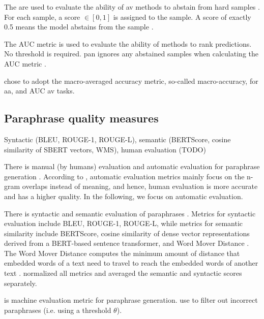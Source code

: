 The  are used to evaluate the ability of \ac{av} methods 
to abstain from hard samples \cite{tyo_state_2022}.
For each sample, a score $\in [0, 1]$ is assigned to the sample.
A score of exactly 0.5 means the model abstains from the sample \cite{tyo_state_2022,bevendorff_overview_2024,kocher_unine_2015}.

The AUC metric is used to evaluate the ability of methods to rank predictions.
No threshold is required.
\ac{pan} ignores any abstained samples when calculating the AUC metric \cite{tyo_state_2022}.

\citet{tyo_state_2022} chose to adopt the macro-averaged accuracy metric, so-called macro-accuracy, for \ac{aa}, 
and AUC \ac{av} tasks.

\subsection{Paraphrase quality measures}
\label{subsec:paraphrase_quality_measures}

Syntactic (BLEU, ROUGE-1, ROUGE-L), semantic (BERTScore, cosine similarity of SBERT vectors, WMS), human evaluation (TODO)

There is manual (by humans) evaluation and automatic evaluation for paraphrase generation \cite{fu_learning_2024,zhou_paraphrase_2021}.
According to \citet{zhou_paraphrase_2021}, automatic evaluation metrics mainly focus on the n-gram overlaps instead of meaning, 
and hence, human evaluation is more accurate and has a higher quality.
In the following, we focus on automatic evaluation.

There is syntactic and semantic evaluation of paraphrases \cite{gohsen_captions_2023}.
Metrics for syntactic evaluation include BLEU, ROUGE-1, ROUGE-L, 
while metrics for semantic similarity include BERTScore, 
cosine similarity of dense vector representations derived from a BERT-based sentence transformer, 
and Word Mover Distance \cite{gohsen_captions_2023}.
The Word Mover Distance computes the minimum amount of distance that embedded words of a text need to travel 
to reach the embedded words of another text \cite{gohsen_captions_2023}.
\citet{gohsen_captions_2023} normalized all metrics and averaged the semantic and syntactic scores separately.

\bluert{} is machine evaluation metric for paraphrase generation.
\citet{fu_learning_2024} use \bluert{} to filter out incorrect paraphrases (i.e. using a threshold $\theta$).


